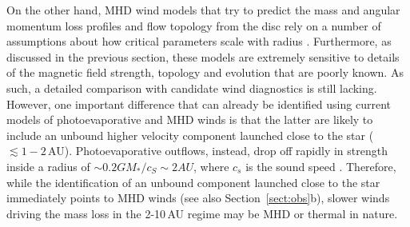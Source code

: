 \documentclass{rsos}
\begin{document}
On the other hand, MHD wind models that try to predict the mass and angular momentum loss profiles and flow topology from the disc rely on a number of assumptions about how critical parameters scale with radius 
\cite{2016arXiv161203912B}. Furthermore, as discussed in the previous section, these models are extremely sensitive to details of the magnetic field strength, topology and evolution that are poorly known. As such, a detailed comparison with candidate wind diagnostics is still lacking. However, one important difference that can already be identified using current models of photoevaporative and MHD winds is that the latter are likely to include an unbound higher velocity component launched close to the star ($\lesssim 1-2$\,AU). Photoevaporative outflows, instead, drop off rapidly in strength inside a radius of $\sim 0.2 G M_* / c_S \sim 2 AU$, where $c_s$ is the sound speed \cite{2013ApJ...778L..14A}. 
Therefore, while the identification of an unbound component launched close to the star immediately points to MHD winds \cite{2016ApJ...831..169S} (see also  Section~\ref{sect:obs}b), slower winds driving the mass loss in the 2-10\,AU regime may be MHD or thermal in nature.
\end{document}
